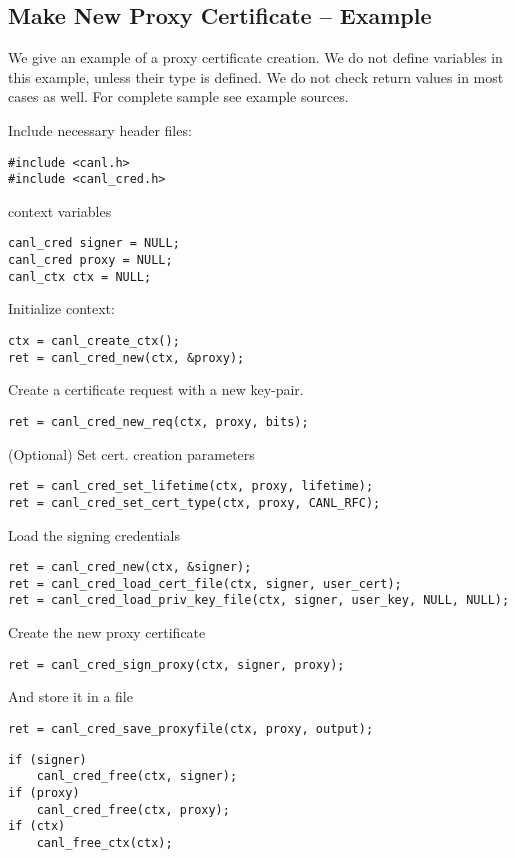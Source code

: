\subsection{Make New Proxy Certificate -- Example}
We give an example of a proxy certificate creation. We do not 
define variables in this example, unless
their type is \CANL defined. We do not check return values in most
cases as well.
For complete sample see example sources.

Include necessary header files:
\begin{lstlisting}
#include <canl.h>
#include <canl_cred.h>
\end{lstlisting}
\CANL context variables
\begin{lstlisting}
canl_cred signer = NULL;
canl_cred proxy = NULL;
canl_ctx ctx = NULL;
\end{lstlisting}

Initialize context:
\begin{lstlisting}
ctx = canl_create_ctx();
ret = canl_cred_new(ctx, &proxy);
\end{lstlisting}

Create a certificate request with a new key-pair.
\begin{lstlisting}
ret = canl_cred_new_req(ctx, proxy, bits);
\end{lstlisting}

(Optional) Set cert. creation parameters
\begin{lstlisting}
ret = canl_cred_set_lifetime(ctx, proxy, lifetime);
ret = canl_cred_set_cert_type(ctx, proxy, CANL_RFC);
\end{lstlisting}

Load the signing credentials
\begin{lstlisting}
ret = canl_cred_new(ctx, &signer);
ret = canl_cred_load_cert_file(ctx, signer, user_cert);
ret = canl_cred_load_priv_key_file(ctx, signer, user_key, NULL, NULL);
\end{lstlisting}

Create the new proxy certificate
\begin{lstlisting}
ret = canl_cred_sign_proxy(ctx, signer, proxy);
\end{lstlisting}

And store it in a file
\begin{lstlisting}
ret = canl_cred_save_proxyfile(ctx, proxy, output);
\end{lstlisting}


\begin{lstlisting}
if (signer)
    canl_cred_free(ctx, signer);
if (proxy)
    canl_cred_free(ctx, proxy);
if (ctx)
    canl_free_ctx(ctx);
\end{lstlisting}
